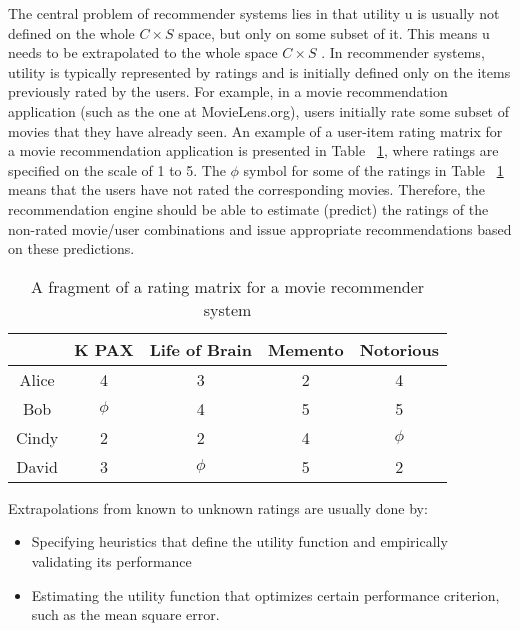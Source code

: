 The central problem of recommender systems lies in that utility u is usually not defined on the whole $C \times S$ space, but only on some subset of it. This means u needs to be extrapolated to the whole space $C \times S$ . In recommender systems, utility is typically represented by ratings and is initially defined only on the items previously rated by the users. For example, in a movie recommendation application (such as the one at MovieLens.org), users initially rate some subset of movies that they have already seen. An example of a user-item rating matrix for a movie recommendation application is presented in Table ~\ref{table:1}, where ratings are specified on the scale of 1 to 5. The $\phi$ symbol for some of the ratings in Table ~\ref{table:1} means that the users have not rated the corresponding movies. Therefore, the recommendation engine should be able to estimate (predict) the ratings of the non-rated movie/user combinations and issue appropriate recommendations based on these predictions.

\begin{table}[ht]
\caption{A fragment of a rating matrix for a movie recommender system} %
\centering  %
\begin{tabular}{c c c c c} %
\hline\hline                        %
 & K PAX & Life of Brain & Memento & Notorious\\ [0.5ex] %
\hline                  %
Alice & 4 & 3& 2 &4  \\ %
Bob & $\phi$ & 4 & 5 &5  \\
Cindy & 2 & 2  & 4 &$\phi$  \\
David & 3 & $\phi$& 5 &2 \\[1ex]      %
\hline %
\end{tabular}
\label{table:1} %
\end{table}


Extrapolations from known to unknown ratings are usually done by:
\begin{itemize}
\item Specifying heuristics that define the utility function and empirically validating its performance
\item Estimating the utility function that optimizes certain performance criterion, such as the mean square error.
\end{itemize}

